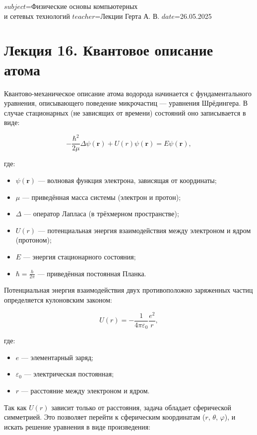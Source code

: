 $subject$=Физические основы компьютерных \\ и сетевых технологий
$teacher$=Лекции Герта А. В.
$date$=26.05.2025

\section{Лекция 16. Квантовое описание атома}

Квантово-механическое описание атома водорода начинается с фундаментального уравнения, описывающего поведение микрочастиц — уравнения Шрёдингера. В случае стационарных (не зависящих от времени) состояний оно записывается в виде:

\[
- \frac{\hbar^2}{2\mu} \Delta \psi(\mathbf{r}) + U(r) \psi(\mathbf{r}) = E \psi(\mathbf{r}),
\]

где:

\begin{itemize}
    \item $\psi(\mathbf{r})$ — волновая функция электрона, зависящая от координаты;
    \item $\mu$ — приведённая масса системы (электрон и протон);
    \item $\Delta$ — оператор Лапласа (в трёхмерном пространстве);
    \item $U(r)$ — потенциальная энергия взаимодействия между электроном и ядром (протоном);
    \item $E$ — энергия стационарного состояния;
    \item $\hbar = \frac{h}{2\pi}$ — приведённая постоянная Планка.
\end{itemize}

Потенциальная энергия взаимодействия двух противоположно заряженных частиц определяется кулоновским законом:

\[
U(r) = -\frac{1}{4\pi \varepsilon_0} \frac{e^2}{r},
\]

где:

\begin{itemize}
    \item $e$ — элементарный заряд;
    \item $\varepsilon_0$ — электрическая постоянная;
    \item $r$ — расстояние между электроном и ядром.
\end{itemize}

Так как $U(r)$ зависит только от расстояния, задача обладает сферической симметрией. Это позволяет перейти к сферическим координатам ($r$, $\theta$, $\varphi$), и искать решение уравнения в виде произведения:


